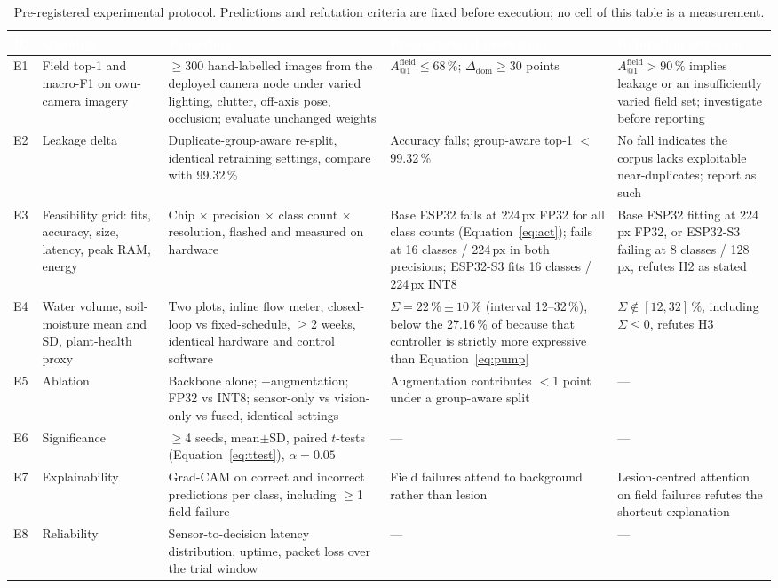\documentclass[journal]{IEEEtran}
\newcommand{\hd}[1]{\textcolor{white}{\textbf{#1}}}
\begin{document}
\begin{table}[t]
\centering
\caption{Pre-registered experimental protocol. Predictions and refutation
criteria are fixed before execution; no cell of this table is a
measurement.}
\label{tab:prereg}
\footnotesize
\setlength{\tabcolsep}{4pt}
\begin{tabular}{p{0.5cm}p{3.5cm}p{4.6cm}p{3.5cm}p{3.3cm}}
\rowcolor{hdr}
\hd{ID} & \hd{Quantity} & \hd{Procedure} & \hd{Pre-registered prediction} &
\hd{Refutation criterion} \\
\midrule
\rowcolor{rowlite}
E1 & Field top-1 and macro-F1 on own-camera imagery &
$\ge$300 hand-labelled images from the deployed camera node under varied
lighting, clutter, off-axis pose, occlusion; evaluate unchanged weights &
$A^{\mathrm{field}}_{@1} \le 68\,\%$; $\Delta_{\mathrm{dom}} \ge 30$ points &
$A^{\mathrm{field}}_{@1} > 90\,\%$ implies leakage or an insufficiently
varied field set; investigate before reporting \\
E2 & Leakage delta &
Duplicate-group-aware re-split, identical retraining settings, compare with
99.32\,\% &
Accuracy falls; group-aware top-1 $<$ 99.32\,\% &
No fall indicates the corpus lacks exploitable near-duplicates; report as
such \\
\rowcolor{rowlite}
E3 & Feasibility grid: fits, accuracy, size, latency, peak RAM, energy &
Chip $\times$ precision $\times$ class count $\times$ resolution, flashed
and measured on hardware &
Base ESP32 fails at 224\,px FP32 for all class counts
(Equation~\ref{eq:act}); fails at 16 classes / 224\,px in both precisions;
ESP32-S3 fits 16 classes / 224\,px INT8 &
Base ESP32 fitting at 224\,px FP32, or ESP32-S3 failing at 8 classes /
128\,px, refutes H2 as stated \\
E4 & Water volume, soil-moisture mean and SD, plant-health proxy &
Two plots, inline flow meter, closed-loop vs fixed-schedule, $\ge$2 weeks,
identical hardware and control software &
$\Sigma = 22\,\% \pm 10\,\%$ (interval 12--32\,\%), below the 27.16\,\%
of \cite{usman2026aiirrigation} because that controller is strictly more
expressive than Equation~\ref{eq:pump} &
$\Sigma \notin [12,32]\,\%$, including $\Sigma \le 0$, refutes H3 \\
\rowcolor{rowlite}
E5 & Ablation &
Backbone alone; $+$augmentation; FP32 vs INT8; sensor-only vs vision-only
vs fused, identical settings &
Augmentation contributes $<$1 point under a group-aware split &
--- \\
E6 & Significance &
$\ge$4 seeds, mean$\pm$SD, paired $t$-tests (Equation~\ref{eq:ttest}),
$\alpha=0.05$ &
--- & --- \\
\rowcolor{rowlite}
E7 & Explainability &
Grad-CAM \cite{selvaraju2017gradcam} on correct and incorrect predictions
per class, including $\ge$1 field failure &
Field failures attend to background rather than lesion
\cite{geirhos2020shortcut} &
Lesion-centred attention on field failures refutes the shortcut
explanation \\
E8 & Reliability &
Sensor-to-decision latency distribution, uptime, packet loss over the trial
window & --- & --- \\
\bottomrule
\end{tabular}
\end{table}
\end{document}
